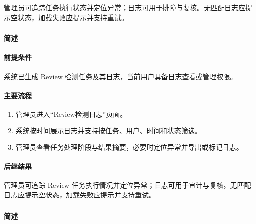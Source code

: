 管理员可追踪任务执行状态并定位异常；日志可用于排障与复核。无匹配日志应提示空状态，加载失败应提示并支持重试。

\subsubsection{}

\paragraph*{简述}


\paragraph*{前提条件}

系统已生成 Review 检测任务及其日志，当前用户具备日志查看或管理权限。

\paragraph*{主要流程}

\begin{enumerate}
    \item 管理员进入“Review检测日志”页面。
    \item 系统按时间展示日志并支持按任务、用户、时间和状态筛选。
    \item 管理员查看任务处理阶段与结果摘要，必要时定位异常并导出或标记日志。
\end{enumerate}

\paragraph*{后继结果}

管理员可追踪 Review 任务执行情况并定位异常；日志可用于审计与复核。无匹配日志应提示空状态，加载失败应提示并支持重试。

\subsubsection{}

\paragraph*{简述}

